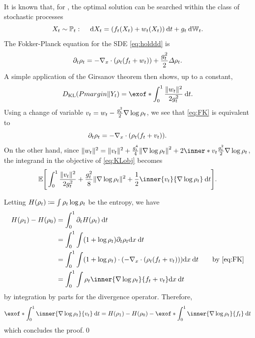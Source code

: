 It is known that, for , the optimal solution can be searched within the class of stochastic processes \citep{leonard2013survey}
\begin{equation}
\label{eq:holddd}
X_t \sim \Pmargin: \quad\dd X_t =  (\driftf(X_t) + \vectalt(X_t) )\dt + \volat \dWiener[\ctime].
\end{equation}
The Fokker-Planck equation for the \acrshort{SDE} \eqref{eq:holddd} is
\begin{align}
\label{eq:FK}
\del_t \measure = - \Div \parens*{  \measure(  \driftf +\vectalt  ) } + \frac{\volatsq[\ctime]}{2}\Laplace \measure.
\end{align}
A simple application of the Girsanov theorem then shows, up to a constant, 
\begin{align}
\label{eq:KLobj}
\KL(Pmargin \| \refsde) = \exof*{ \int_0^\horizon\frac{\norm{\vectalt}^2}{2\volatsq[\ctime]}   \dt}.
\end{align}
Using a change of variable $\vect = \vectalt - \frac{\volatsq[\ctime]}{2}\nabla\log\measure$, we see that \eqref{eq:FK} is equivalent to
\begin{equation}
\del_t \measure = - \Div \parens*{  \measure(  \driftf +\vect  ) }.
\end{equation}
On the other hand, since $\norm{\vectalt}^2 = \norm{\vect}^2 + \frac{\volat^4}{4}\norm*{\nabla\log\measure}^2 + 2 \inner*{\vect}{ \frac{\volatsq[\ctime]}{2}\nabla\log\measure}$, the integrand in the objective of \eqref{eq:KLobj} becomes 
\begin{align}
 \mathbb{E}\Bigg[\int_0^\horizon  \frac{\norm{\vect}^2}{2\volatsq[\ctime]} + \frac{\volatsq[\ctime]}{8} \norm{\nabla \log \measure}^2  + \frac{1}{2} \inner{\vect}{\nabla \log\measure} \dt\Bigg].
\end{align}


Letting $H(\measure) \defeq \int \measure\log\measure$ be the entropy, we have
\begin{align*}
H(\measure[\horizon]) - H(\measure[0]) &= \int_0^\horizon \del_t H(\measure) \dt \\
&= \int_0^\horizon  \int   (1+ \log\measure) \del_t\measure \drm \point \dt  \\
&= \int_0^\horizon  \int   (1+ \log\measure) \cdot \parens*{ - \Div \parens*{ \measure(\driftf+\vect) }  } \drm \point \dt  \quad\quad \text{by \eqref{eq:FK}}\\
&= \int_0^\horizon  \int   \measure \inner{\nabla\log\measure}{ \driftf+\vect} \drm \point \dt 
\end{align*}
by integration by parts for the divergence operator. Therefore,
\begin{align}
\exof*{\int_0^\horizon  \inner{\nabla\log\measure}{ \vect}  \dt } = H(\measure[\horizon]) - H(\measure[0])-\exof*{\int_0^\horizon  \inner{\nabla\log\measure}{ \driftf}  \dt }
\end{align} 
which concludes the proof.\qed



